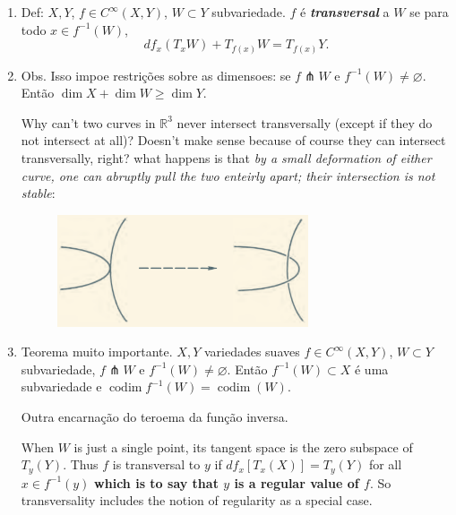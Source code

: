 \begin{enumerate}
\item Def: \(X,Y\),  \(f \in C^\infty(X,Y)\), \(W \subset Y\) subvariedade. \(f\) é \textit{\textbf{transversal}} a \(W\) se para todo  \(x \in f^{-1}(W)\),
	\[df_x(T_xW)+T_{f(x)}W=T_{f(x)}Y.\]
\item Obs. Isso impoe restrições sobre as dimensoes: se \(f \pitchfork W\) e \(f^{-1}(W)\neq \varnothing.\) Então \(\dim X + \dim W \geq \dim Y\).

	\begin{remark}\leavevmode
	Why can't two curves in \(\mathbb{R}^3\) never intersect transversally (except if they do not intersect at all)? Doesn't make sense because of course they can intersect transversally, right? what happens is that \textit{by a small deformation of either curve, one can abruptly pull the two enteirly apart; their intersection is not stable}:
	\begin{figure}[H]
		\centering
		\includegraphics[width=0.7\textwidth]{fig2}
		\caption*{}
	\end{figure}
	\end{remark}
\item Teorema muito importante. \(X,Y\) variedades suaves \(f \in C^\infty(X,Y)\), \(W \subset Y\) subvariedade, \(f \pitchfork W\) e \(f^{-1}(W) \neq  \varnothing\). Então \(f^{-1}(W)\subset X\) é uma subvariedade e \(\operatorname{codim}f^{-1}(W)=\operatorname{codim}(W)\).

	Outra encarnação do teroema da função inversa.

	\begin{remark}\leavevmode
	When \(W\) is just a single point, its tangent space is the zero subspace of \(T_y(Y)\). Thus \(f\) is transversal to \(y\) if \(df_x[T_x(X)]=T_y(Y)\) for all \(x \in f^{-1}(y)\) \textbf{which is to say that \(y\) is a regular value of \(f\)}. So transversality includes the notion of regularity as a special case. 
\end{remark}
\end{enumerate}

